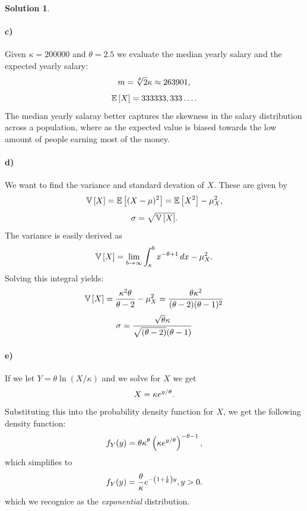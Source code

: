 \documentclass[a4paper, fleqn]{amsart}
\theoremstyle{definition}
\newtheorem{sltn}{Solution}
\begin{document}
\begin{sltn}
\paragraph{c)}
Given $\kappa = 200000$ and $\theta = 2.5$ we evaluate the median yearly salary and the expected yearly salary:
\begin{equation}
  \notag
  m = \sqrt[\theta]{2}\kappa \approx 263901, 
\end{equation}
\begin{equation}
  \notag
  \mathbb{E}\left[ X \right] = 333333,333\dots.
\end{equation}
The median yearly salaray better captures the skewness in the salary
distribution across a population, where as the expected value is biased towards
the low amount of people earning most of the money.

\paragraph{d)}
We want to find the variance and standard devation of $X$. These are given by
\begin{equation}
  \notag
  \mathbb{V}\left[ X \right] = \mathbb{E}\left[ (X - \mu)^2 \right] = \mathbb{E}\left[ X^{2} \right] - \mu_X^{2}, 
\end{equation}
\begin{equation}
  \notag
  \sigma = \sqrt{\mathbb{V}\left[ X \right]}.
\end{equation}
The variance is easily derived as
\begin{equation}
  \notag
  \mathbb{V}\left[ X \right] = \lim\limits_{b\rightarrow\infty}\int_{\kappa}^{b}x^{-\theta+1}\, dx - \mu_X^{2}.
\end{equation}
Solving this integral yields:
\begin{equation}
  \notag
  \mathbb{V}\left[ X \right] = \frac{\kappa^{2}\theta}{\theta - 2} - \mu_X^{2} = \frac{\theta\kappa^2}{(\theta-2)(\theta-1)^2}
\end{equation}
\begin{equation}
  \notag
  \sigma = \frac{\sqrt{\theta}\kappa}{\sqrt{(\theta-2)}(\theta -1)}
\end{equation}

\paragraph{e)} If we let $Y  = \theta\ln(X/\kappa)$ and we solve for $X$ we get
\begin{equation}
  \notag
  X = \kappa e^{y/\theta}.
\end{equation}
Substituting this into the probability density function for $X$, we get the following density function:
\begin{equation}
  \notag
  f_{Y}(y) = \theta\kappa^{\theta}\left( \kappa e^{y/\theta} \right)^{-\theta - 1}, 
\end{equation}
which simplifies to
\begin{equation}
  \notag
  f_{Y}(y) = \frac{\theta}{\kappa} e^{-\left(1 + \frac{1}{\theta}\right)y}, y > 0.
\end{equation}
which we recognice as the \textit{exponential} distribution.
\end{sltn}
\end{document}
